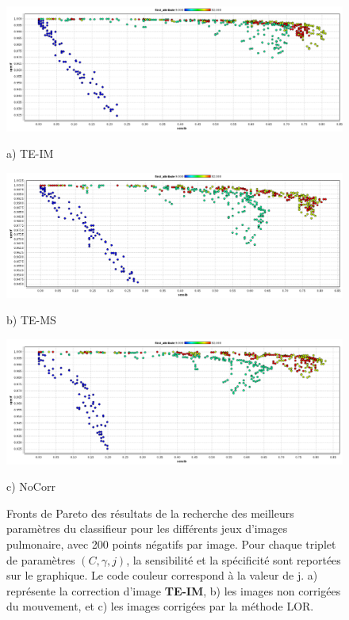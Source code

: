 \begin{figure}[h!]

\begin{center}
 \includegraphics[width=14cm]{images/pareto_mod_IM.png}

{\small a) TE-IM}
\vspace{0.5cm}

\includegraphics[width=14cm]{images/pareto_mod_LOR.png}
 
{\small b) TE-MS}
\vspace{0.5cm}

\includegraphics[width=14cm]{images/pareto_mod_NoCorr.png}

{\small c) NoCorr}

\end{center}
 \caption[Fronts de Pareto des résultats de la recherche des meilleurs paramètres du classifieur pour les différents jeux d'images pulmonaire]{Fronts de Pareto des résultats de la recherche des meilleurs paramètres du classifieur pour les différents jeux d'images pulmonaire, avec 200 points négatifs par image. Pour chaque triplet de paramètres $(C, \gamma, j)$, la sensibilité et la spécificité sont reportées sur le graphique. Le code couleur correspond à la valeur de j. a) représente la correction d'image \textbf{TE-IM}, b) les images non corrigées du mouvement, et c) les images corrigées par la méthode LOR.}
\label{fig:paretoModalite} 
\end{figure}








